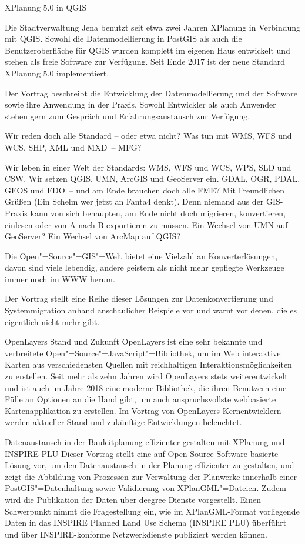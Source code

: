 %
{XPlanung 5.0 in QGIS}%
{}%
{
Die Stadtverwaltung Jena benutzt seit etwa zwei Jahren XPlanung in Verbindung mit QGIS. Sowohl die
Datenmodellierung in PostGIS als auch die Benutzeroberfläche für QGIS wurden komplett im eigenen
Haus entwickelt und stehen als freie Software zur Verfügung. Seit Ende 2017 ist der neue Standard
XPlanung 5.0 implementiert.

Der Vortrag beschreibt die Entwicklung der Datenmodellierung und der
Software sowie ihre Anwendung in der Praxis. Sowohl Entwickler als auch Anwender stehen gern zum
Gespräch und Erfahrungsaustausch zur Verfügung.
}


%
{Wir reden doch alle Standard -- oder etwa nicht?\vspace{0.2em}}%
{Was tun mit WMS, WFS und WCS, SHP, XML und MXD~-- MFG?}%
{
Wir leben in einer Welt der Standards: WMS, WFS und WCS, WPS, SLD und CSW.  Wir setzen QGIS, UMN,
ArcGIS und GeoServer ein.  GDAL, OGR, PDAL, GEOS und FDO~-- und am Ende brauchen doch alle FME?  Mit
Freundlichen Grüßen (Ein Schelm wer jetzt an Fanta4 denkt). Denn niemand aus der GIS-Praxis kann von
sich behaupten, am Ende nicht doch migrieren, konvertieren, einlesen oder von A nach B exportieren
zu müssen.  Ein Wechsel von UMN auf GeoServer?  Ein Wechsel von ArcMap auf QGIS?

Die Open"=Source"=GIS"=Welt bietet eine Vielzahl an Konverterlösungen, davon sind viele lebendig,
andere geistern als nicht mehr gepflegte Werkzeuge immer noch im WWW herum.

Der Vortrag stellt eine Reihe dieser Lösungen zur Datenkonvertierung und Systemmigration anhand
anschaulicher Beispiele vor und warnt vor denen, die es eigentlich nicht mehr gibt.
}

%
{OpenLayers}%
{Stand und Zukunft}%
{
OpenLayers ist eine sehr bekannte und verbreitete Open"=Source"=JavaScript"=Bibliothek, um im Web
interaktive Karten aus verschiedensten Quellen mit reichhaltigen Interaktionsmöglichkeiten zu erstellen.
Seit mehr als zehn Jahren wird OpenLayers stets weiterentwickelt und ist auch im Jahre 2018 eine
moderne Bibliothek, die ihren Benutzern eine Fülle an Optionen an die Hand gibt, um auch
anspruchsvollste webbasierte Kartenapplikation zu erstellen.
%
Im Vortrag von OpenLayers-Kernentwicklern werden aktueller Stand und zukünftige Entwicklungen
beleuchtet.%
}

%
{Datenaustausch in der Bauleit\-planung effizienter gestalten mit XPlanung und INSPIRE PLU}%
{}%
{
Dieser Vortrag stellt eine auf Open-Source-Software basierte Lösung vor, um den Datenaustausch in der
Planung effizienter zu gestalten, und zeigt die Abbildung von Prozessen zur Verwaltung der Planwerke
innerhalb einer PostGIS"=Datenhaltung sowie Validierung von XPlanGML"=Dateien. Zudem wird die
Publikation der Daten über deegree Dienste vorgestellt.  Einen Schwerpunkt nimmt die Fragestellung
ein, wie im XPlanGML-Format vorliegende Daten in das INSPIRE Planned Land Use Schema (INSPIRE PLU) überführt
und über INSPIRE-konforme Netzwerkdienste publiziert werden können.%
}

